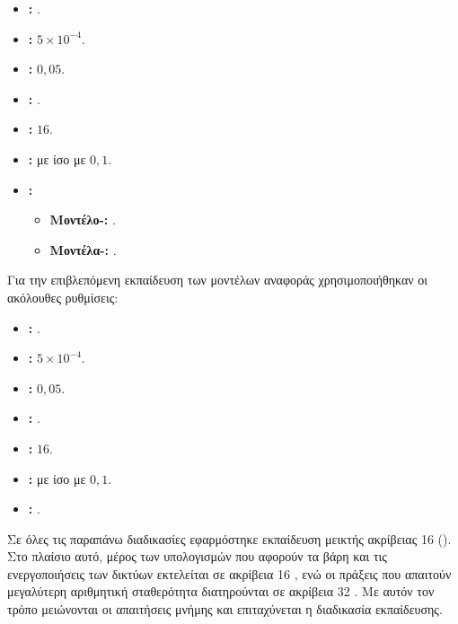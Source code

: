 \begin{itemize}
    \item \textbf{:} .
    \item \textbf{:} \(5\times10^{-4}\).
    \item \textbf{:} \(0{,}05\).
    \item \textbf{:}
    .
    \item \textbf{:} \(16\).
    \item \textbf{:}  με
     ίσο με \(0{,}1\).
    \item \textbf{:}
    \begin{itemize}
        \item \textbf{Μοντέλο-:} .
        \item \textbf{Μοντέλα-:} .
    \end{itemize}
\end{itemize}
\vspace{0.5\baselineskip}
Για την επιβλεπόμενη εκπαίδευση των μοντέλων αναφοράς χρησιμοποιήθηκαν οι ακόλουθες
ρυθμίσεις:

\begin{itemize}
    \item \textbf{:} .
    \item \textbf{:} \(5\times10^{-4}\).
    \item \textbf{:} \(0{,}05\).
    \item \textbf{:}
    .
    \item \textbf{:} \(16\).
    \item \textbf{:}  με
     ίσο με \(0{,}1\).
    \item \textbf{:}
    .
\end{itemize}
\vspace{0.5\baselineskip}

Σε όλες τις παραπάνω διαδικασίες εφαρμόστηκε εκπαίδευση μεικτής
ακρίβειας 16  (). Στο
πλαίσιο αυτό, μέρος των υπολογισμών που αφορούν τα βάρη και τις
ενεργοποιήσεις των δικτύων εκτελείται σε ακρίβεια 16 , ενώ οι
πράξεις που απαιτούν μεγαλύτερη αριθμητική σταθερότητα διατηρούνται σε
ακρίβεια 32 . Με αυτόν τον τρόπο μειώνονται οι απαιτήσεις
μνήμης και επιταχύνεται η διαδικασία εκπαίδευσης.

